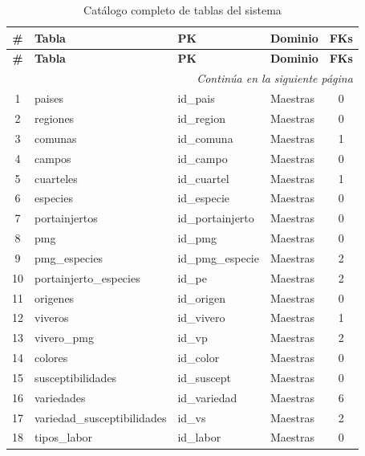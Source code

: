 \documentclass[12pt,a4paper,twoside]{report}
\begin{document}
\begin{longtable}{clllc}
\caption{Cat\'alogo completo de tablas del sistema} \\
\toprule
\textbf{\#} & \textbf{Tabla} & \textbf{PK} & \textbf{Dominio} & \textbf{FKs} \\
\midrule
\endfirsthead
\toprule
\textbf{\#} & \textbf{Tabla} & \textbf{PK} & \textbf{Dominio} & \textbf{FKs} \\
\midrule
\endhead
\midrule
\multicolumn{5}{r}{\textit{Contin\'ua en la siguiente p\'agina}} \\
\bottomrule
\endfoot
\bottomrule
\endlastfoot
1  & paises                     & id\_pais          & Maestras  & 0 \\
2  & regiones                   & id\_region        & Maestras  & 0 \\
3  & comunas                    & id\_comuna        & Maestras  & 1 \\
4  & campos                     & id\_campo         & Maestras  & 0 \\
5  & cuarteles                  & id\_cuartel       & Maestras  & 1 \\
6  & especies                   & id\_especie       & Maestras  & 0 \\
7  & portainjertos              & id\_portainjerto  & Maestras  & 0 \\
8  & pmg                        & id\_pmg           & Maestras  & 0 \\
9  & pmg\_especies              & id\_pmg\_especie  & Maestras  & 2 \\
10 & portainjerto\_especies     & id\_pe            & Maestras  & 2 \\
11 & origenes                   & id\_origen        & Maestras  & 0 \\
12 & viveros                    & id\_vivero        & Maestras  & 1 \\
13 & vivero\_pmg                & id\_vp            & Maestras  & 2 \\
14 & colores                    & id\_color         & Maestras  & 0 \\
15 & susceptibilidades          & id\_suscept       & Maestras  & 0 \\
16 & variedades                 & id\_variedad      & Maestras  & 6 \\
17 & variedad\_susceptibilidades & id\_vs           & Maestras  & 2 \\
18 & tipos\_labor               & id\_labor         & Maestras  & 0 \\

\end{longtable}
\end{document}
